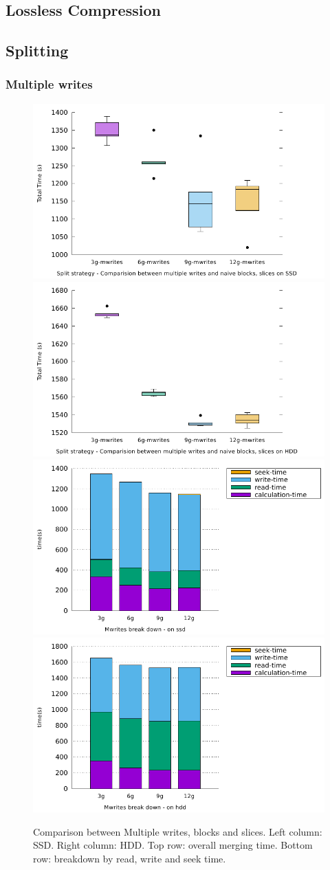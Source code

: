 \documentclass[10pt, conference, compsocconf]{IEEEtran}
\begin{document}
\subsection{Lossless Compression}

\subsection{Splitting}

\subsubsection{Multiple writes}
\begin{figure}[h]
  \centering
  \includegraphics[width=0.45\columnwidth]{figures/benchmark-mwrites/mwrites-comparision-ssd.pdf}
  \hfill
  \includegraphics[width=0.45\columnwidth]{figures/benchmark-mwrites/mwrites-comparision-hdd.pdf}\\
  \includegraphics[width=0.45\columnwidth]{figures/benchmark-mwrites/mwrites-breakdown-ssd.pdf}
  \hfill
    \includegraphics[width=0.45\columnwidth]{figures/benchmark-mwrites/mwrites-breakdown-hdd.pdf}
  \caption{Comparison between Multiple writes, blocks and slices. Left column: SSD. Right column: HDD. Top row: overall merging time. Bottom row: breakdown by read, write and seek time.}
\label{fig:multiple-writes}
\end{figure}
\end{document}
